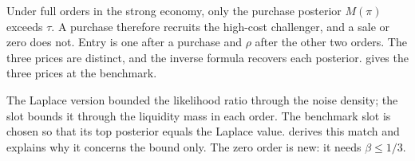 Under full orders in the strong economy, only the purchase posterior $M(\pi)$ exceeds $\tau$.
A purchase therefore recruits the high-cost challenger, and a sale or zero does not.
Entry is one after a purchase and $\rho$ after the other two orders.
The three prices are distinct, and the inverse formula recovers each posterior.
 gives the three prices at the benchmark.

\begin{panelnote}
The Laplace version bounded the likelihood ratio through the noise density; the slot bounds it through the liquidity mass in each order.
The benchmark slot is chosen so that its top posterior equals the Laplace value.
 derives this match and explains why it concerns the bound only.
The zero order is new: it needs $\beta\le1/3$.
\end{panelnote}
